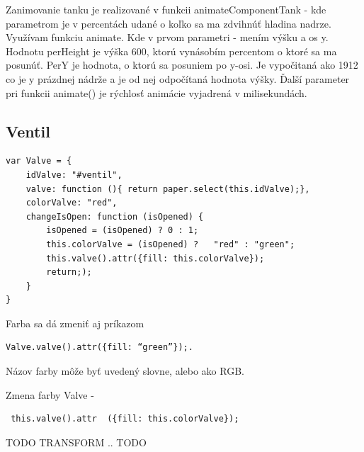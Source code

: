 Zanimovanie tanku je realizované v funkcii animateComponentTank - kde parametrom je v percentách udané o koľko sa ma zdvihnúť hladina nadrze. 
Využívam funkciu animate. Kde v prvom parametri - mením výšku a os y. Hodnotu perHeight je výška 600, ktorú vynásobím percentom o ktoré sa ma posunúť. PerY je hodnota, o ktorú sa posuniem po y-osi. Je vypočitaná ako 1912 co je y prázdnej nádrže a je od nej odpočítaná hodnota výšky. 
Ďalší parameter pri funkcii animate() je rýchlosť animácie vyjadrená v milisekundách.

\subsection{Ventil}

\begin{lstlisting}
var Valve = {
	idValve: "#ventil",
	valve: function (){ return paper.select(this.idValve);},
	colorValve: "red",
	changeIsOpen: function (isOpened) {
		isOpened = (isOpened) ? 0 : 1;
		this.colorValve = (isOpened) ?   "red" : "green";
		this.valve().attr({fill: this.colorValve});
		return;);
	}
}
\end{lstlisting}

Farba sa dá zmeniť aj príkazom 

\begin{verbatim}
Valve.valve().attr({fill: “green”});.
\end{verbatim}

Názov farby môže byť uvedený slovne, alebo ako RGB. 

Zmena farby Valve - \begin{verbatim} this.valve().attr  ({fill: this.colorValve}); \end{verbatim}


TODO TRANSFORM .. TODO